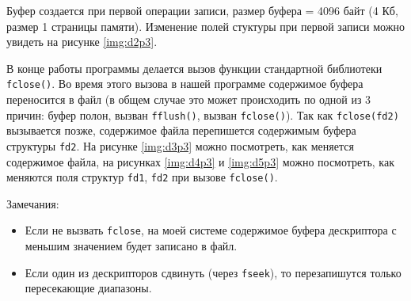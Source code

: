 
Буфер создается при первой операции записи, размер буфера = 4096 байт (4 Кб, размер 1 страницы памяти). Изменение полей стуктуры при первой записи можно увидеть на рисунке \ref{img:d2p3}.


В конце работы программы делается вызов функции стандартной библиотеки \texttt{fclose()}. Во время этого вызова в нашей программе содержимое буфера переносится в файл (в общем случае это может происходить по одной из 3 причин: буфер полон, вызван \texttt{fflush()}, вызван \texttt{fclose()}). Так как \texttt{fclose(fd2)} вызывается позже, содержимое файла перепишется содержимым буфера структуры \texttt{fd2}. На рисунке \ref{img:d3p3} можно посмотреть, как меняется содержимое файла, на рисунках \ref{img:d4p3} и \ref{img:d5p3} можно посмотреть, как меняются поля структур \texttt{fd1}, \texttt{fd2} при вызове \texttt{fclose()}.




\clearpage

Замечания:

\begin{itemize}
    \item Если не вызвать \texttt{fclose}, на моей системе содержимое буфера дескриптора с меньшим значением будет записано в файл.
    \item Если один из дескрипторов сдвинуть (через \texttt{fseek}), то перезапишутся только пересекающие диапазоны.
\end{itemize}
